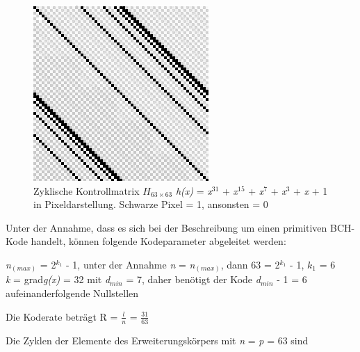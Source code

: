 \documentclass[11pt,a4paper]{article}
\begin{document}
\begin{figure}
	\includegraphics[width=\linewidth]{hmatrix.png}
	\caption{Zyklische Kontrollmatrix $H_{63 \times 63}$ \textit{h(x)} = \textit{x$^{31}$} + \textit{x$^{15}$} + \textit{x$^{7}$} + \textit{x$^{3}$} + \textit{x} + 1  in Pixeldarstellung. Schwarze Pixel = 1, ansonsten = 0}
	\label{fig:HK_G_H}
\end{figure}


Unter der Annahme, dass es sich bei der Beschreibung um einen primitiven BCH-Kode handelt, können folgende Kodeparameter abgeleitet werden: 

\textit{n$_{(max)}$} = 2\textit{$^{k_{1}}$} - 1, unter der Annahme \textit{n} = \textit{n$_{(max)}$}, dann 63 = 2\textit{$^{k_{1}}$} - 1, \textit{$k_{1}$} = 6 \\
\textit{k} = grad\textit{g(x)} = 32
mit \textit{d$_{min}$} = 7, daher benötigt der Kode \textit{d$_{min}$} - 1 = 6 aufeinanderfolgende Nullstellen

Die Koderate beträgt R = $\frac{l}{n}$ = $\frac{31}{63}$

Die Zyklen der Elemente des Erweiterungskörpers mit \textit{n} = \textit{p} = 63 sind \\
\end{document}
